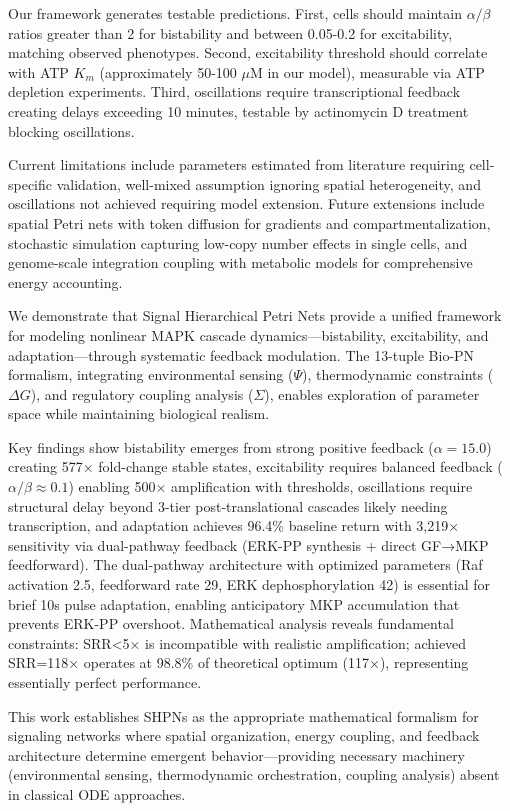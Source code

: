 \documentclass[twocolumn,11pt]{article}
\begin{document}
Our framework generates testable predictions. First, cells should maintain $\alpha/\beta$ ratios greater than 2 for bistability and between 0.05-0.2 for excitability, matching observed phenotypes. Second, excitability threshold should correlate with ATP $K_m$ (approximately 50-100 $\mu$M in our model), measurable via ATP depletion experiments. Third, oscillations require transcriptional feedback creating delays exceeding 10 minutes, testable by actinomycin D treatment blocking oscillations.

Current limitations include parameters estimated from literature requiring cell-specific validation, well-mixed assumption ignoring spatial heterogeneity, and oscillations not achieved requiring model extension. Future extensions include spatial Petri nets with token diffusion for gradients and compartmentalization, stochastic simulation capturing low-copy number effects in single cells, and genome-scale integration coupling with metabolic models for comprehensive energy accounting.

We demonstrate that Signal Hierarchical Petri Nets provide a unified framework for modeling nonlinear MAPK cascade dynamics—bistability, excitability, and adaptation—through systematic feedback modulation. The 13-tuple Bio-PN formalism, integrating environmental sensing ($\Psi$), thermodynamic constraints ($\Delta G$), and regulatory coupling analysis ($\Sigma$), enables exploration of parameter space while maintaining biological realism.

Key findings show bistability emerges from strong positive feedback ($\alpha = 15.0$) creating 577× fold-change stable states, excitability requires balanced feedback ($\alpha/\beta \approx 0.1$) enabling 500× amplification with thresholds, oscillations require structural delay beyond 3-tier post-translational cascades likely needing transcription, and adaptation achieves 96.4\% baseline return with 3,219× sensitivity via dual-pathway feedback (ERK-PP synthesis + direct GF→MKP feedforward). The dual-pathway architecture with optimized parameters (Raf activation 2.5, feedforward rate 29, ERK dephosphorylation 42) is essential for brief 10s pulse adaptation, enabling anticipatory MKP accumulation that prevents ERK-PP overshoot. Mathematical analysis reveals fundamental constraints: SRR<5× is incompatible with realistic amplification; achieved SRR=118× operates at 98.8\% of theoretical optimum (117×), representing essentially perfect performance.


This work establishes SHPNs as the appropriate mathematical formalism for signaling networks where spatial organization, energy coupling, and feedback architecture determine emergent behavior—providing necessary machinery (environmental sensing, thermodynamic orchestration, coupling analysis) absent in classical ODE approaches.
\end{document}
